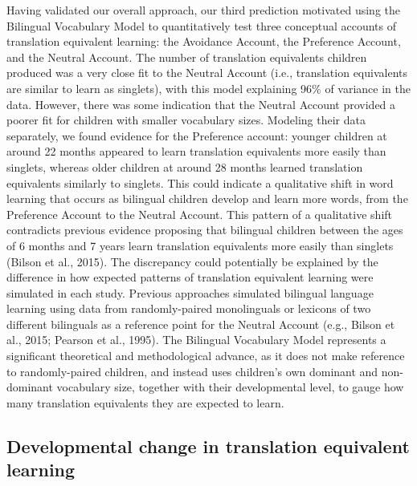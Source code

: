 \documentclass[
  english,
  ,man,floatsintext]{apa6}
\begin{document}
Having validated our overall approach, our third prediction motivated using the Bilingual Vocabulary Model to quantitatively test three conceptual accounts of translation equivalent learning: the Avoidance Account, the Preference Account, and the Neutral Account. The number of translation equivalents children produced was a very close fit to the Neutral Account (i.e., translation equivalents are similar to learn as singlets), with this model explaining 96\% of variance in the data. However, there was some indication that the Neutral Account provided a poorer fit for children with smaller vocabulary sizes. Modeling their data separately, we found evidence for the Preference account: younger children at around 22 months appeared to learn translation equivalents more easily than singlets, whereas older children at around 28 months learned translation equivalents similarly to singlets. This could indicate a qualitative shift in word learning that occurs as bilingual children develop and learn more words, from the Preference Account to the Neutral Account. This pattern of a qualitative shift contradicts previous evidence proposing that bilingual children between the ages of 6 months and 7 years learn translation equivalents more easily than singlets (Bilson et al., 2015). The discrepancy could potentially be explained by the difference in how expected patterns of translation equivalent learning were simulated in each study. Previous approaches simulated bilingual language learning using data from randomly-paired monolinguals or lexicons of two different bilinguals as a reference point for the Neutral Account (e.g., Bilson et al., 2015; Pearson et al., 1995). The Bilingual Vocabulary Model represents a significant theoretical and methodological advance, as it does not make reference to randomly-paired children, and instead uses children's own dominant and non-dominant vocabulary size, together with their developmental level, to gauge how many translation equivalents they are expected to learn.

\hypertarget{developmental-change-in-translation-equivalent-learning}{%
\subsection{Developmental change in translation equivalent learning}\label{developmental-change-in-translation-equivalent-learning}}
\end{document}

